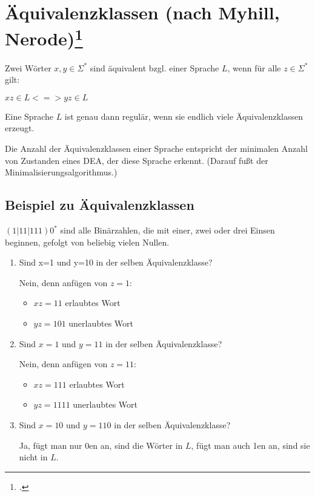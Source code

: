 \documentclass{lehramt-informatik-haupt}
\begin{document}
\section{Äquivalenzklassen (nach Myhill, Nerode)\footcite{theo:fs:}}

Zwei Wörter $x, y \in \Sigma^*$ sind äquivalent bzgl. einer Sprache $L$,
wenn für alle $z \in Σ^*$ gilt:

$xz \in L <=> yz \in L$

Eine Sprache $L$ ist genau dann regulär, wenn sie endlich viele
Äquivalenzklassen erzeugt.

Die Anzahl der Äquivalenzklassen einer Sprache entspricht der
minimalen Anzahl von Zustanden eines DEA, der diese Sprache
erkennt. (Darauf fußt der Minimalisierungsalgorithmus.)

\subsection{Beispiel zu Äquivalenzklassen}

$(1|11|111)0^*$ sind alle Binärzahlen, die mit einer, zwei oder drei
Einsen beginnen, gefolgt von beliebig vielen Nullen.

\begin{enumerate}
\item Sind x=1 und y=10 in der selben Äquivalenzklasse?

Nein, denn anfügen von $z=1$:

\begin{itemize}
\item $xz = 11$ erlaubtes Wort

\item $yz = 101$ unerlaubtes Wort
\end{itemize}

\item Sind $x=1$ und $y=11$ in der selben Äquivalenzklasse?

Nein, denn anfügen von $z=11$:

\begin{itemize}
\item $xz = 111$ erlaubtes Wort
\item $yz = 1111$ unerlaubtes Wort
\end{itemize}

\item Sind $x=10$ und $y=110$ in der selben Äquivalenzklasse?

Ja, fügt man nur 0en an, sind die Wörter in $L$, fügt man auch 1en an,
sind sie nicht in $L$.
\end{enumerate}
\end{document}
